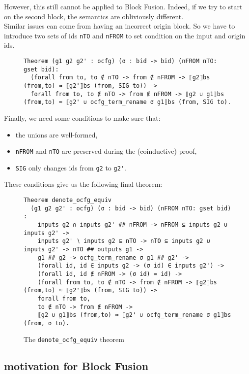 \documentclass[11pt]{article}
\newcommand{\inlinecoq}[1]{\mbox{\lstinline[style=customcoq,columns=fixed,basewidth=.48em]{#1}}}
\newcommand{\ilc}[1]{\inlinecoq{#1}}
\begin{document}
However, this still cannot be applied to Block Fusion. Indeed, if we try to start on the second block, the semantics are obliviously different.\\
Similar issues can come from having an incorrect origin block. So we have to introduce two sets of ids \ilc{nTO} and \ilc{nFROM} to set condition on the input and origin ids.\\
\begin{figure}[H]
  \begin{lstlisting}[style=customcoq,basicstyle=\small\ttfamily]
Theorem (g1 g2 g2' : ocfg) (σ : bid -> bid) (nFROM nTO: gset bid):
  (forall from to, to ∉ nTO -> from ∉ nFROM -> ⟦g2⟧bs (from,to) ≈ ⟦g2'⟧bs (from, SIG to)) ->
  forall from to, to ∉ nTO -> from ∉ nFROM -> ⟦g2 ∪ g1⟧bs (from,to) ≈ ⟦g2' ∪ ocfg_term_rename σ g1⟧bs (from, SIG to).
  \end{lstlisting}
\end{figure}

Finally, we need some conditions to make sure that:\begin{itemize}
  \item the unions are well-formed,
  \item \ilc{nFROM} and \ilc{nTO} are preserved during the (coinductive) proof,
  \item \ilc{SIG} only changes ids from \ilc{g2} to \ilc{g2'}.
\end{itemize}

These conditions give us the following final theorem:
\begin{figure}[H]
\begin{lstlisting}[style=customcoq,basicstyle=\small\ttfamily]
Theorem denote_ocfg_equiv
  (g1 g2 g2' : ocfg) (σ : bid -> bid) (nFROM nTO: gset bid) :
    inputs g2 ∩ inputs g2' ## nFROM -> nFROM ⊆ inputs g2 ∪ inputs g2' ->
    inputs g2' ∖ inputs g2 ⊆ nTO -> nTO ⊆ inputs g2 ∪ inputs g2' -> nTO ## outputs g1 ->
    g1 ## g2 -> ocfg_term_rename σ g1 ## g2' ->
    (forall id, id ∈ inputs g2 -> (σ id) ∈ inputs g2') ->
    (forall id, id ∉ nFROM -> (σ id) = id) ->
    (forall from to, to ∉ nTO -> from ∉ nFROM -> ⟦g2⟧bs (from,to) ≈ ⟦g2'⟧bs (from, SIG to)) ->
    forall from to,
    to ∉ nTO -> from ∉ nFROM ->
    ⟦g2 ∪ g1⟧bs (from,to) ≈ ⟦g2' ∪ ocfg_term_rename σ g1⟧bs (from, σ to).
  \end{lstlisting}
  \caption{The \ilc{denote_ocfg_equiv} theorem}
\end{figure}

\subsection{motivation for Block Fusion}
\end{document}
